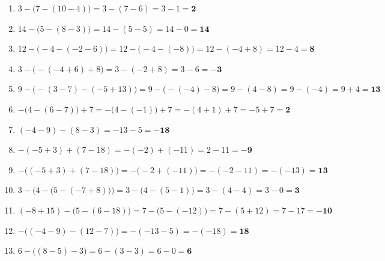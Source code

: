 \documentclass[a4paper,10pt]{article} %
\begin{document}
\begin{enumerate}

  \item \(3 - \big( 7 - (10 - 4) \big) =
    3 - (7 - 6) = 3 - 1 =
    \mathbf{2}\) %

  \item \(14 - \big( 5 - (8 - 3) \big) =
    14 - (5 - 5) =
    14 - 0 =
    \mathbf{14}\) %

  \item \(12 - \big( -4 - (-2 - 6) \big) =
    12 - \big( -4 - (-8) \big) =
    12 - (-4 + 8) =
    12 - 4 =
    \mathbf{8}\) %

  \item \(3 - \big( -(-4 + 6) + 8 \big) =
    3 - (-2 + 8) =
    3 - 6 =
    \mathbf{-3}\) %

  \item \(9 - \big( -(3 - 7) - (-5 + 13) \big) =
    9 - \big( -(-4) - 8 \big) =
    9 - (4 - 8) =
    9 - (-4) =
    9 + 4 =
    \mathbf{13}\) %

  \item \(- \big( 4 - (6 - 7) \big) + 7 =
    - \big( 4 - (-1) \big) + 7 =
    -(4 + 1) + 7 =
    -5 + 7 =
    \mathbf{2}\) %

  \item \((-4 - 9) - (8 - 3) =
    -13 - 5 =
    \mathbf{-18}\) %

  \item \(-(-5 + 3) + (7 - 18) =
    -(-2) + (-11) =
    2 - 11 =
    \mathbf{-9}\) %

  \item \(- \big( (-5 + 3) + (7 - 18) \big) =
    - \big( -2 + (-11) \big) =
    -(-2 - 11) =
    -(-13) =
    \mathbf{13}\) %

  \item \(3 - \Big( 4 - \big( 5 - (-7 + 8) \big) \Big) =
    3 - \big( 4 - (5 - 1) \big) =
    3 - (4 - 4) =
    3 - 0 =
    \mathbf{3}\) %

  \item \((-8 + 15) - \big( 5 - (6 - 18) \big) =
    7 - \big( 5 - (-12) \big) =
    7 - (5 + 12) =
    7 - 17 =
    \mathbf{-10}\) %

  \item \(- \big( (-4 - 9) - (12 - 7) \big) =
    -(-13 - 5) =
    -(-18) =
    \mathbf{18}\) %

  \item \(6 - \big( (8 - 5) - 3 \big) =
    6 - (3 - 3) =
    6 - 0 =
    \mathbf{6}\) %


\end{enumerate}
\end{document}
